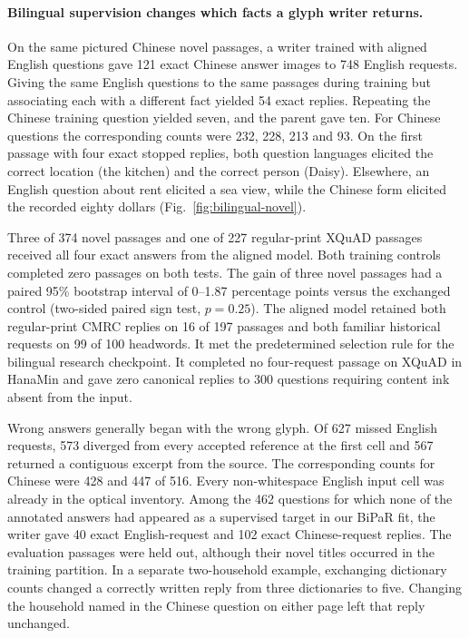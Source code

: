 \documentclass[12pt,a4paper]{article}
\providecommand{\DIFadd}[1]{{\protect\color{blue} \sf #1}} %
\begin{document}
\paragraph{\DIFadd{Bilingual supervision changes which facts a glyph writer returns.}}
\DIFadd{On the same pictured Chinese novel passages, a writer trained with aligned English questions gave 121 exact Chinese answer images to 748 English requests. Giving the same English questions to the same passages during training but associating each with a different fact yielded 54 exact replies. Repeating the Chinese training question yielded seven, and the parent gave ten. For Chinese questions the corresponding counts were 232, 228, 213 and 93. On the first passage with four exact stopped replies, both question languages elicited the correct location (the kitchen) and the correct person (Daisy). Elsewhere, an English question about rent elicited a sea view, while the Chinese form elicited the recorded eighty dollars (Fig.~\ref{fig:bilingual-novel}).
}

\DIFadd{Three of 374 novel passages and one of 227 regular-print XQuAD passages received all four exact answers from the aligned model. Both training controls completed zero passages on both tests. The gain of three novel passages had a paired 95\% bootstrap interval of 0--1.87 percentage points versus the exchanged control (two-sided paired sign test, $p=0.25$). The aligned model retained both regular-print CMRC replies on 16 of 197 passages and both familiar historical requests on 99 of 100 headwords. It met the predetermined selection rule for the bilingual research checkpoint. It completed no four-request passage on XQuAD in HanaMin and gave zero canonical replies to 300 questions requiring content ink absent from the input.
}

\DIFadd{Wrong answers generally began with the wrong glyph. Of 627 missed English requests, 573 diverged from every accepted reference at the first cell and 567 returned a contiguous excerpt from the source. The corresponding counts for Chinese were 428 and 447 of 516. Every non-whitespace English input cell was already in the optical inventory. Among the 462 questions for which none of the annotated answers had appeared as a supervised target in our BiPaR fit, the writer gave 40 exact English-request and 102 exact Chinese-request replies. The evaluation passages were held out, although their novel titles occurred in the training partition. In a separate two-household example, exchanging dictionary counts changed a correctly written reply from three dictionaries to five. Changing the household named in the Chinese question on either page left that reply unchanged.
}
\end{document}
